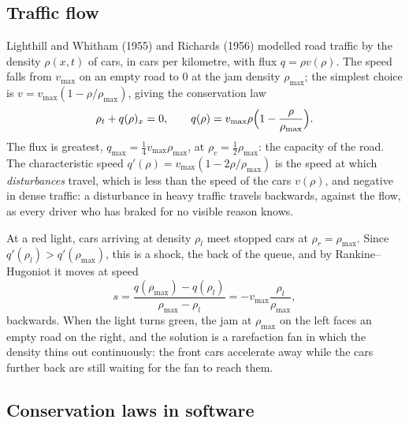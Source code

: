 \documentclass[11pt,a4paper]{article}
\numberwithin{equation}{section}
\theoremstyle{definition}
\begin{document}
\subsection{Traffic flow}
\label{ssec:traffic}

Lighthill and Whitham (1955) and Richards (1956) modelled road traffic by the density $\rho(x, t)$ of cars, in cars per kilometre, with flux $q = \rho v(\rho)$. The speed falls from $v_{\max}$ on an empty road to $0$ at the
jam density $\rho_{\max}$; the simplest choice is $v = v_{\max}(1 - \rho/\rho_{\max})$, giving the conservation law
\[
\rho_t + q(\rho)_x = 0, \qquad q(\rho) = v_{\max}\rho\Bigl(1 - \frac{\rho}{\rho_{\max}}\Bigr) .
\]
The flux is greatest, $q_{\max} = \frac14v_{\max}\rho_{\max}$, at $\rho_c = \frac12\rho_{\max}$: the capacity of the road. The characteristic speed $q'(\rho) = v_{\max}(1 - 2\rho/\rho_{\max})$ is the speed at which \emph{disturbances} travel, which is less than
the speed of the cars $v(\rho)$, and negative in dense traffic: a disturbance in heavy traffic travels backwards, against the flow, as every driver who has braked for no visible reason knows.

At a red light, cars arriving at density $\rho_l$ meet stopped cars at $\rho_r = \rho_{\max}$. Since $q'(\rho_l) > q'(\rho_{\max})$, this is a shock, the back of the queue, and by Rankine--Hugoniot it moves at speed
\[
s = \frac{q(\rho_{\max}) - q(\rho_l)}{\rho_{\max} - \rho_l} = -v_{\max}\frac{\rho_l}{\rho_{\max}} ,
\]
backwards. When the light turns green, the jam at $\rho_{\max}$ on the left faces an empty road on the right, and the solution is a rarefaction fan in which the density thins out continuously:
the front cars accelerate away while the cars further back are still waiting for the fan to reach them.

\subsection{Conservation laws in software}
\label{ssec:software2}
\end{document}
